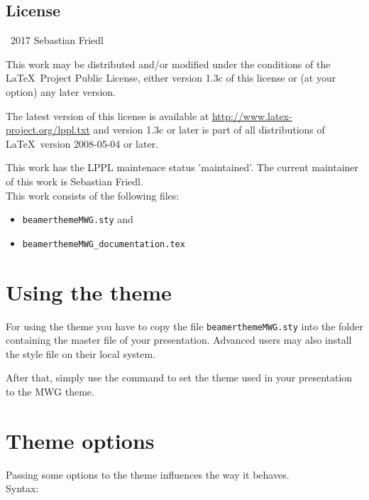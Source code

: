 \documentclass[11pt]{ltxdoc}
\begin{document}
	\subsection*{License}
	\begin{small}
		\textcopyright\ 2017 Sebastian Friedl
		
		\smallskip
		This work may be distributed and/or modified under the conditions of the \LaTeX\ Project Public License, either version 1.3c of this license or (at your option) any later version.
		
		\smallskip
		The latest version of this license is available at \url{http://www.latex-project.org/lppl.txt} and version 1.3c or later is part of all distributions of \LaTeX\ version 2008-05-04 or later.
	
		\smallskip
		This work has the LPPL maintenace status 'maintained'. The current maintainer of this work is Sebastian Friedl. \\
		This work consists of the following files:
		\begin{itemize} \itemsep 0pt
			\item \texttt{beamerthemeMWG.sty} and
			\item \texttt{beamerthemeMWG\_documentation.tex}
		\end{itemize}
	\end{small}
	
	\clearpage
	
	
	
	
	
	\section{Using the theme}
	For using the theme you have to copy the file \texttt{beamerthemeMWG.sty} into the folder containing the master file of your presentation. Advanced users may also install the style file on their local system. \par
	After that, simply use the command \texttt{} to set the theme used in your presentation to the MWG theme.

	
	\section{Theme options}				\label{themeoptions}
	Passing some options to the theme influences the way it behaves. \\
	Syntax: \ \ \texttt{}
	
\end{document}
